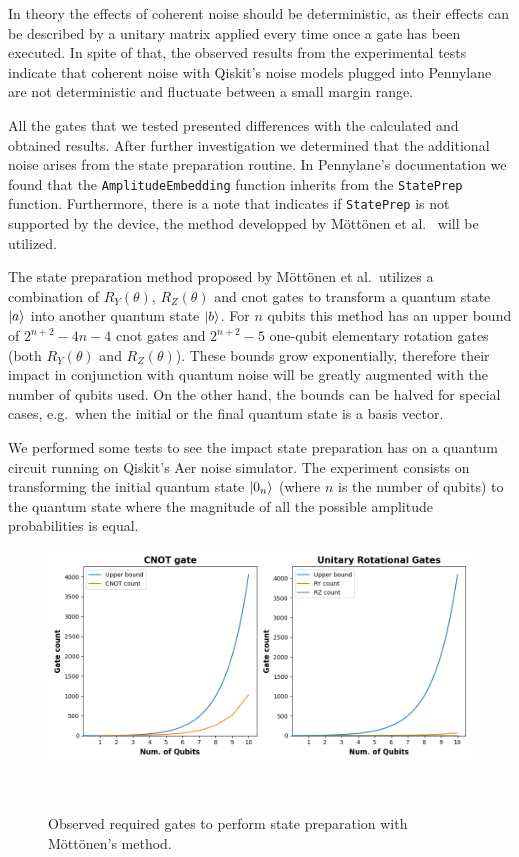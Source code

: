 In theory the effects of coherent noise should be deterministic,
as their effects can be described by a unitary matrix applied
every time once a gate has been executed. In spite of that,
the observed results from the experimental tests indicate that
coherent noise with Qiskit's noise models plugged into Pennylane
are not deterministic and fluctuate between a small margin range. \

All the gates that we tested presented differences with the
calculated and obtained results. After further investigation
we determined that the additional noise arises from the state
preparation routine. In Pennylane's documentation we found that
the \colorbox{inline_gray}{\lstinline|AmplitudeEmbedding|} function
inherits from the \colorbox{inline_gray}{\lstinline|StatePrep|}
function. Furthermore, there is a note that indicates
if \colorbox{inline_gray}{\lstinline|StatePrep|} is not supported
by the device, the method developped by Möttönen et al.~\cite{mottonen_transformation_2004}
will be utilized. \

The state preparation method proposed by Möttönen et al.\ utilizes a
combination of \(R_{Y}(\theta)\), \(R_{Z}(\theta)\) and \ac{cnot}
gates to transform a quantum state \(\ket{a}\) into another quantum state
\(\ket{b}\). For \(n\) qubits this method has an upper bound of
\(2^{n+2}-4n-4\) \ac{cnot} gates and \(2^{n+2}-5\) one-qubit elementary
rotation gates (both \(R_{Y}(\theta)\) and \(R_{Z}(\theta)\)). These
bounds grow exponentially, therefore their impact in conjunction with
quantum noise will be greatly augmented with the number of qubits used.
On the other hand, the bounds can be halved for special cases, e.g.\ when
the initial or the final quantum state is a basis vector. \

We performed some tests to see the impact state preparation has on
a quantum circuit running on Qiskit's Aer noise simulator. The experiment
consists on transforming the initial quantum state \(\ket{0_{n}}\)
(where \(n\) is the number of qubits) to the quantum state where the
magnitude of all the possible amplitude probabilities is equal. \

\begin{figure}[h!]
  \includegraphics[scale=0.55]{figures/state-prep-gates-count.png}
  \centering
  \caption{Observed required gates to perform state preparation with Möttönen's method.}
~\label{fig:state_prep}
\end{figure} \

